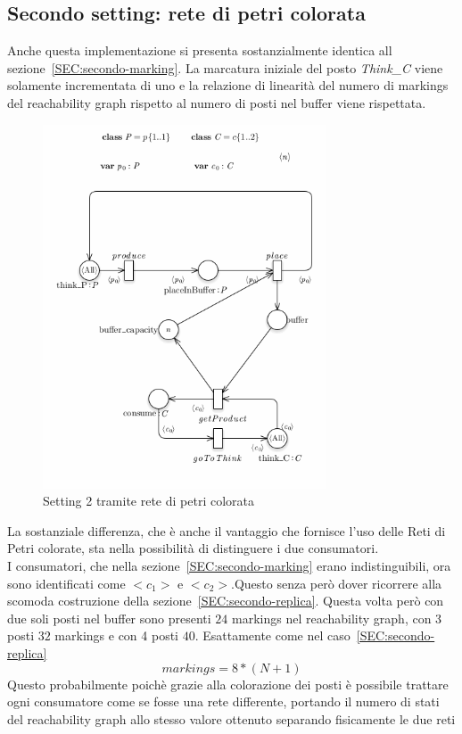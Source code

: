 \documentclass{article}
\begin{document}
\subsection{Secondo setting: rete di petri colorata}
Anche questa implementazione si presenta sostanzialmente identica all sezione~\ref{SEC:secondo-marking}.
La marcatura iniziale del posto \textit{Think\_C} viene solamente incrementata di uno e la relazione di linearità del numero di markings del reachability graph rispetto al numero di posti nel buffer viene rispettata.\\
\begin{figure}[!ht]
\centering
\includegraphics[width=0.75\textwidth]{./Esercizio2_img/setting_2_CPN.png}
\caption{Setting 2 tramite rete di petri colorata} \label{FIG:setting2_CPN}
\end{figure}
La sostanziale differenza, che è anche il vantaggio che fornisce l'uso delle Reti di Petri colorate, sta nella possibilità di distinguere i due consumatori.\\
I consumatori, che nella sezione~\ref{SEC:secondo-marking} erano indistinguibili, ora sono identificati come $<c_1>$ e $<c_2>$.Questo senza però dover ricorrere alla scomoda costruzione della sezione~\ref{SEC:secondo-replica}.
Questa volta però con due soli posti nel buffer sono presenti $24$ markings nel reachability graph, con 3 posti $32$ markings e con 4 posti $40$. Esattamente come nel caso~\ref{SEC:secondo-replica}
$$markings = 8 * (N + 1)$$
Questo probabilmente poichè grazie alla colorazione dei posti è possibile trattare ogni consumatore come se fosse una rete differente, portando il numero di stati del reachability graph allo stesso valore ottenuto separando fisicamente le due reti
\end{document}
